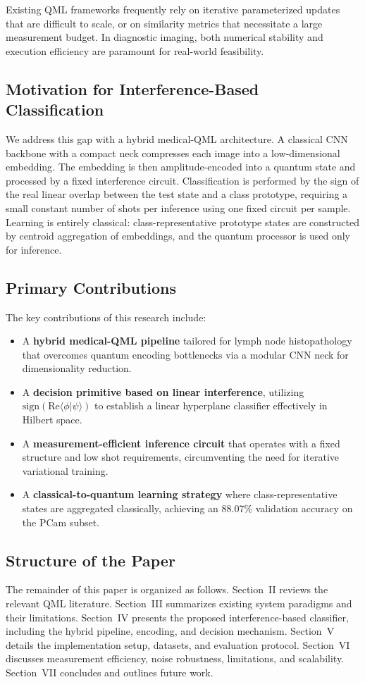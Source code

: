 \documentclass[conference]{IEEEtran}
\begin{document}
Existing QML frameworks frequently rely on iterative parameterized updates that are difficult to scale, or on similarity metrics that necessitate a large measurement budget. In diagnostic imaging, both numerical stability and execution efficiency are paramount for real-world feasibility.

\subsection{Motivation for Interference-Based Classification}
We address this gap with a hybrid medical-QML architecture. A classical CNN backbone with a compact neck compresses each image into a low-dimensional embedding. The embedding is then amplitude-encoded into a quantum state and processed by a fixed interference circuit. Classification is performed by the sign of the real linear overlap between the test state and a class prototype, requiring a small constant number of shots per inference using one fixed circuit per sample. Learning is entirely classical: class-representative prototype states are constructed by centroid aggregation of embeddings, and the quantum processor is used only for inference.

\subsection{Primary Contributions}
The key contributions of this research include:
\begin{itemize}
    \item A \textbf{hybrid medical-QML pipeline} tailored for lymph node histopathology that overcomes quantum encoding bottlenecks via a modular CNN neck for dimensionality reduction.
    \item A \textbf{decision primitive based on linear interference}, utilizing $\mathrm{sign}(\mathrm{Re}\langle\phi|\psi\rangle)$ to establish a linear hyperplane classifier effectively in Hilbert space.
    \item A \textbf{measurement-efficient inference circuit} that operates with a fixed structure and low shot requirements, circumventing the need for iterative variational training.
    \item A \textbf{classical-to-quantum learning strategy} where class-representative states are aggregated classically, achieving an 88.07\% validation accuracy on the PCam subset.
\end{itemize}

\subsection{Structure of the Paper}
The remainder of this paper is organized as follows. Section~II reviews the relevant QML literature. Section~III summarizes existing system paradigms and their limitations. Section~IV presents the proposed interference-based classifier, including the hybrid pipeline, encoding, and decision mechanism. Section~V details the implementation setup, datasets, and evaluation protocol. Section~VI discusses measurement efficiency, noise robustness, limitations, and scalability. Section~VII concludes and outlines future work.
\end{document}
